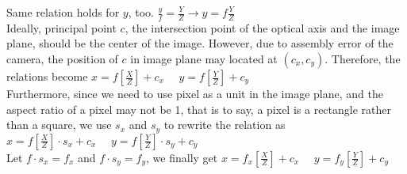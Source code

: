 \documentclass[12pt, a4paper]{article}
\begin{document}
\begin{enumerate}
Same relation holds for $y$, too. $\displaystyle \frac{y}{f} = \frac{Y}{Z} \rightarrow y = f \frac{Y}{Z}$ \\
Ideally, principal point $c$, the intersection point of the optical axis and the image plane, should be the center of the image. However, due to assembly error of the camera, the position of $c$ in image plane may located at $(c_x, c_y)$. Therefore, the relations become 
$\displaystyle x = f [\frac{X}{Z}] + c_x \mbox{ }\mbox{ } y = f [\frac{Y}{Z}] + c_y$ \\
Furthermore, since we need to use pixel as a unit in the image plane, and the aspect ratio of a pixel may not be 1, that is to say, a pixel is a rectangle rather than a square, we use $s_x$ and $s_y$ to rewrite the relation as \\
$\displaystyle x = f [\frac{X}{Z}] \cdot s_x + c_x \mbox{ }\mbox{ } y = f [\frac{Y}{Z}] \cdot s_y + c_y$ \\
Let $\displaystyle f \cdot s_x = f_x$ and $\displaystyle f \cdot s_y = f_y$, we finally get 
$\displaystyle x = f_x [\frac{X}{Z}] + c_x \mbox{ }\mbox{ } y = f_y [\frac{Y}{Z}] + c_y$


\end{enumerate}
\end{document}
